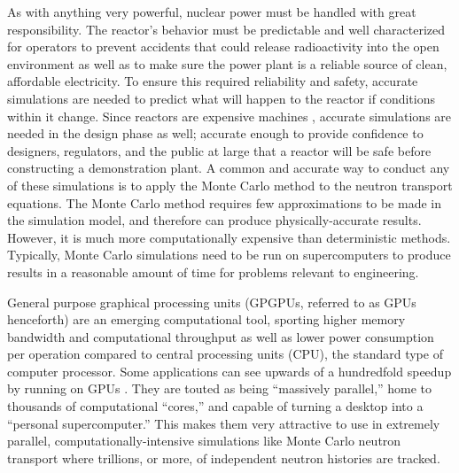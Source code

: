 As with anything very powerful, nuclear power must be handled with great responsibility.  The reactor's behavior must be predictable and well characterized for operators to prevent accidents that could release radioactivity into the open environment as well as to make sure the power plant is a reliable source of clean, affordable electricity.  To ensure this required reliability and safety, accurate simulations are needed to predict what will happen to the reactor if conditions within it change.  Since reactors are  expensive machines \cite{}, accurate simulations are needed in the design phase as well; accurate enough to provide confidence to designers, regulators, and the public at large that a reactor will be safe before constructing a demonstration plant.  A common and accurate way to conduct any of these simulations is to apply the Monte Carlo method to the neutron transport equations.  The Monte Carlo method requires few approximations to be made in the simulation model, and therefore can produce  physically-accurate results.  However, it is much more computationally expensive than deterministic methods.  Typically, Monte Carlo simulations need to be run on supercomputers to produce results in a reasonable amount of time for problems relevant to engineering.

General purpose graphical processing units (GPGPUs, referred to as GPUs henceforth) are an emerging computational tool, sporting higher memory bandwidth and computational throughput as well as lower power consumption per operation compared to central processing units (CPU), the standard type of computer processor.  Some applications can see upwards of a hundredfold speedup by running on GPUs \cite{nvidia_speedups}.  They are touted as being ``massively parallel,'' home to thousands of computational ``cores,'' and capable of turning a desktop into a ``personal supercomputer.''  This makes them very attractive to use in extremely parallel, computationally-intensive simulations like Monte Carlo neutron transport where trillions, or more, of independent neutron histories are tracked.   

